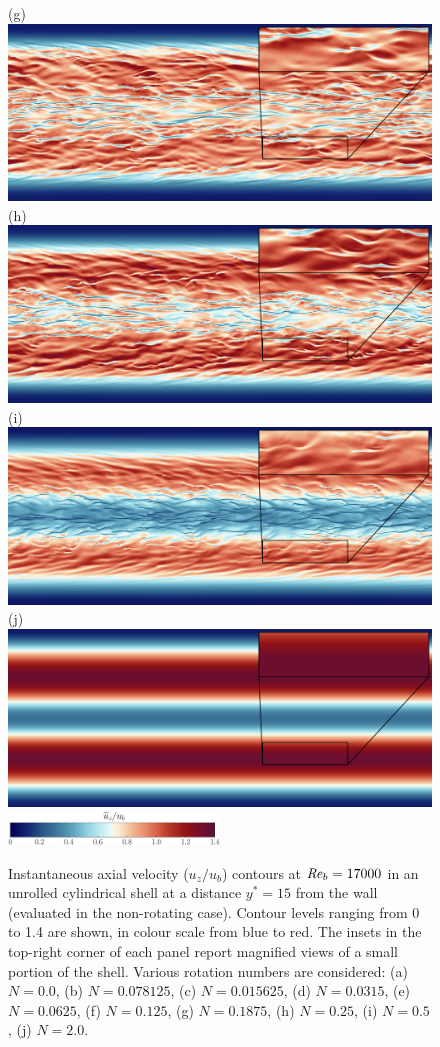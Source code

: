 \documentclass[lineno]{jfm}
\begin{document}
\begin{figure}
                (g) \includegraphics[width=6.cm]{Figures/unrolled_rotz0_roty0.1875_u.png} \\ 
		(h) \includegraphics[width=6.cm]{Figures/unrolled_rotz0_roty0.25_u.png} 
		(i) \includegraphics[width=6.cm]{Figures/unrolled_rotz0_roty0.5_u.png} \\
                (j) \includegraphics[width=6.cm]{Figures/unrolled_rotz0_roty1.0_u.png} 
		\\ \includegraphics[width=0.5\textwidth]{Figures/uz_cmap.eps}
		\caption{
			Instantaneous axial velocity ($u_z/u_b$) contours at $\mbox{\textit{Re}}_b = 17000$
			in an unrolled cylindrical shell at a distance
			$y^*=15$ from the wall (evaluated in the non-rotating case).
			Contour levels ranging from 0 to 1.4 are shown,
			in colour scale from blue to red. 
			The insets in the top-right corner of each panel report magnified views of a small portion of the shell.
			Various rotation numbers are considered:
                        (a) $N = 0.0$,
                        (b) $N = 0.078125$,
                        (c) $N = 0.015625$,
                        (d) $N = 0.0315$,
                        (e) $N = 0.0625$,
                        (f) $N = 0.125$,
                        (g) $N = 0.1875$,
                        (h) $N = 0.25$,
                        (i) $N = 0.5$,
                        (j) $N = 2.0$.
		}
			\label{fig:utz_500} 
	\end{figure}
	 
\end{document}
